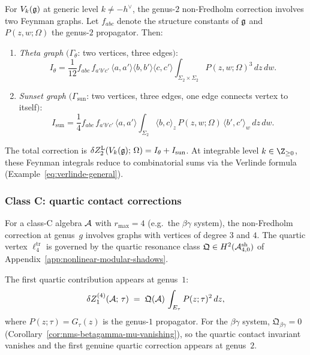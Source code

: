 \begin{example}%
\label{ex:thqg-X-affine-genus-2}%
%
For $V_k(\mathfrak{g})$ at generic level $k \neq -h^\vee$, the
genus-$2$ non-Fredholm correction involves two Feynman graphs.
Let $f_{abc}$ denote the structure constants of $\mathfrak{g}$
and $P(z,w;\Omega)$ the genus-$2$ propagator. Then:
\begin{enumerate}[label=\textup{(\alph*)}]
\item \emph{Theta graph}
 $(\Gamma_\theta$: two vertices, three edges$)$:
 \begin{equation}\label{eq:thqg-X-theta-graph}
 I_{\theta}
 = \frac{1}{12}
 f_{abc}\,f_{a'b'c'}\,
 \langle a,a'\rangle\langle b,b'\rangle\langle c,c'\rangle
 \int_{\Sigma_2 \times \Sigma_2}
 P(z,w;\Omega)^3\,dz\,dw.
 \end{equation}
\item \emph{Sunset graph}
 $(\Gamma_{\mathrm{sun}}$: two vertices, three edges,
 one edge connects vertex to itself$)$:
 \begin{equation}\label{eq:thqg-X-sunset-graph}
 I_{\mathrm{sun}}
 = \frac{1}{4}
 f_{abc}\,f_{a'b'c'}\,
 \langle a,a'\rangle
 \int_{\Sigma_2}
 \langle b, c\rangle_z
 \,P(z,w;\Omega)\,
 \langle b', c'\rangle_w\,
 dz\,dw.
 \end{equation}
\end{enumerate}
The total correction is
$\delta Z_2^{\mathrm{L}}(V_k(\mathfrak{g});\,\Omega)
= I_\theta + I_{\mathrm{sun}}$.
At integrable level $k \in \Z_{\geq 0}$, these Feynman
integrals reduce to combinatorial sums via the Verlinde
formula (Example~\ref{eq:verlinde-general}).
\end{example}

\subsubsection{Class C: quartic contact corrections}

\begin{proposition}%
\label{prop:thqg-X-class-C-quartic}%
%
For a class-C algebra $\mathcal{A}$ with $r_{\max} = 4$
\textup{(}e.g.\ the $\beta\gamma$ system\textup{)},
the non-Fredholm correction at genus~$g$ involves
graphs with vertices of degree $3$ and $4$.
The quartic vertex $\ell_4^{\mathrm{tr}}$ is governed by the
quartic resonance class
$\mathfrak{Q} \in H^2(\mathcal{A}^{\mathrm{sh}}_{4,0})$
of Appendix~\textup{\ref{app:nonlinear-modular-shadows}}.

The first quartic contribution appears at genus~$1$:
\begin{equation}\label{eq:thqg-X-quartic-genus-1}
\delta Z_1^{(4)}(\mathcal{A};\,\tau)
\;=\;
\mathfrak{Q}(\mathcal{A})\,
\int_{E_\tau}
P(z;\tau)^2\,dz,
\end{equation}
where $P(z;\tau) = G_\tau(z)$ is the genus-$1$ propagator.
For the $\beta\gamma$ system,
$\mathfrak{Q}_{\beta\gamma} = 0$
\textup{(}Corollary~\textup{\ref{cor:nms-betagamma-mu-vanishing}}\textup{)},
so the quartic contact invariant vanishes and the first
genuine quartic correction appears at genus~$2$.
\end{proposition}

